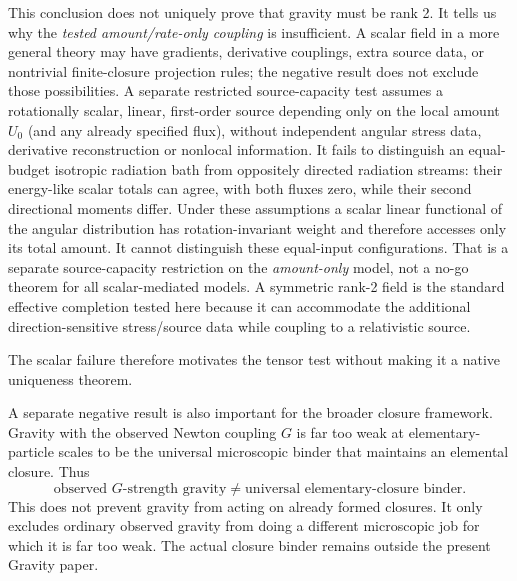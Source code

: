 \documentclass[11pt]{article}
\theoremstyle{plain}
\theoremstyle{remark}
\begin{document}
This conclusion does not uniquely prove that gravity must be rank 2.  It tells us why
the \emph{tested amount/rate-only coupling} is insufficient.  A scalar field in a more
general theory may have gradients, derivative couplings, extra source data, or
nontrivial finite-closure projection rules; the negative result does not exclude
those possibilities.  A separate restricted source-capacity test assumes a
rotationally scalar, linear, first-order source depending only on the local
amount $U_0$ (and any already specified flux), without independent angular
stress data, derivative reconstruction or nonlocal information.  It fails to distinguish an equal-budget isotropic radiation bath
from oppositely directed radiation streams: their energy-like scalar totals can
agree, with both fluxes zero, while their second directional moments differ.
Under these assumptions a scalar linear functional of the angular distribution
has rotation-invariant weight and therefore accesses only its total amount.
It cannot distinguish these equal-input configurations.  That is a separate
source-capacity restriction on the \emph{amount-only} model, not a no-go theorem
for all scalar-mediated models.  A symmetric rank-2 field is the standard effective
completion tested here because it can accommodate the additional direction-sensitive
stress/source data while coupling to a relativistic source.

The scalar failure therefore motivates the tensor test without making it a native
uniqueness theorem.

A separate negative result is also important for the broader closure framework.  Gravity
with the observed Newton coupling $G$ is far too weak at elementary-particle scales to be
the universal microscopic binder that maintains an elemental closure.  Thus
\begin{equation}
\boxed{
\text{observed }G\text{-strength gravity}
\neq
\text{universal elementary-closure binder}.}
\label{eq:not-binder}
\end{equation}
This does not prevent gravity from acting on already formed closures.  It only excludes
ordinary observed gravity from doing a different microscopic job for which it is far too
weak.  The actual closure binder remains outside the present Gravity paper.
\end{document}
